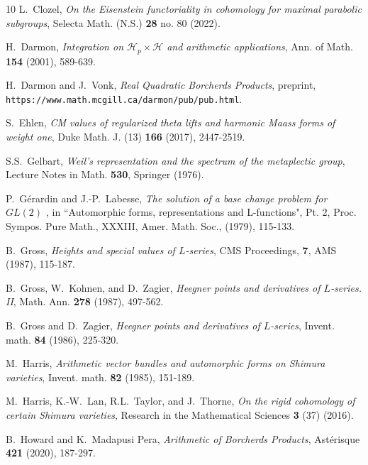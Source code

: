 \documentclass{amsart}
\theoremstyle{definition}
\begin{document}
\begin{thebibliography}{10}
 L.~Clozel, {\it{On the Eisenstein functoriality in cohomology for maximal parabolic subgroups}}, Selecta Math. (N.S.) {\bf{28}} no. 80 (2022).

 H.~Darmon, {\it{Integration on $\mathcal{H}_p \times \mathcal{H}$ and arithmetic applications}}, Ann. of Math. {\bf{154}} (2001), 589-639.

 H.~Darmon and J.~Vonk, {\it{Real Quadratic Borcherds Products}}, preprint, \texttt{https://www.math.mcgill.ca/darmon/pub/pub.html}.

 S.~Ehlen, {\it{CM values of regularized theta lifts and harmonic Maass forms of weight one}}, Duke Math. J. (13) {\bf{166}} (2017), 2447-2519.  

 S.S.~Gelbart, {\it{Weil's representation and the spectrum of the metaplectic group}}, Lecture Notes in Math. {\bf{530}}, Springer (1976).

 P.~G\'erardin and J.-P.~Labesse, {\it{The solution of a base change problem for $GL(2)$ }},  in ``Automorphic forms, representations and L-functions", Pt. 2, Proc. Sympos. Pure Math., XXXIII, Amer. Math. Soc., (1979), 115-133.


 B.~Gross, {\it{Heights and special values of $L$-series}}, CMS Proceedings, {\bf{7}}, AMS (1987), 115-187. 

 B.~Gross, W.~Kohnen, and D.~Zagier, {\it{Heegner points and derivatives of $L$-series. II}}, Math. Ann. {\bf{278}} (1987), 497-562.

 B.~Gross and D.~Zagier, {\it{Heegner points and derivatives of $L$-series}}, Invent. math. {\bf{84}} (1986), 225-320.

 M.~Harris, {\it{Arithmetic vector bundles and automorphic forms on Shimura varieties}}, Invent. math. {\bf{82}} (1985), 151-189.

 M.~Harris, K.-W.~Lan, R.L.~Taylor, and J.~Thorne, {\it{On the rigid cohomology of certain Shimura varieties}}, Research in the Mathematical Sciences {\bf{3}} (37) (2016). 

 B.~Howard and K.~Madapusi Pera, {\it{Arithmetic of Borcherds Products}}, Ast\'erisque {\bf{421}} (2020), 187-297.


\end{thebibliography}
\end{document}

